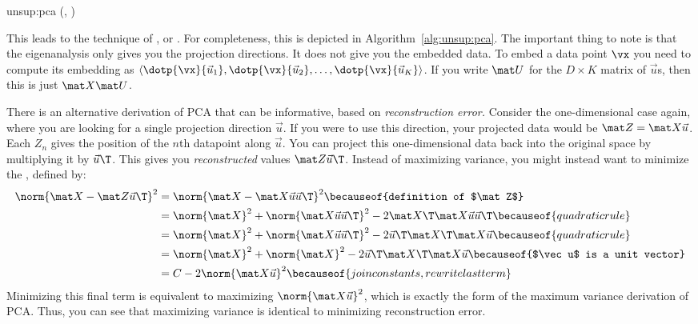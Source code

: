 \newalgorithm%
  {unsup:pca}%
  {(, )}
  {
}

This leads to the technique of , or .  For completeness, this is depicted in
Algorithm~\ref{alg:unsup:pca}.  The important thing to note is that
the eigenanalysis only gives you the projection directions.  It does
not give you the embedded data.  To embed a data point $\vx$ you need
to compute its embedding as $\langle \dotp{\vx}{\vec u_1},
\dotp{\vx}{\vec u_2}, \dots, \dotp{\vx}{\vec u_K} \rangle$.  If you
write $\mat U$ for the $D \times K$ matrix of $\vec u$s, then this is
just $\mat X \mat U$.

There is an alternative derivation of PCA that can be informative,
based on \emph{reconstruction error.}  Consider the one-dimensional
case again, where you are looking for a single projection direction
$\vec u$.  If you were to use this direction, your projected data
would be $\mat Z = \mat X \vec u$.  Each $Z_n$ gives the position of
the $n$th datapoint along $\vec u$.  You can project this
one-dimensional data back into the original space by multiplying it by
$\vec u\T$.  This gives you \emph{reconstructed} values $\mat Z \vec
u\T$.  Instead of maximizing variance, you might instead want to
minimize the , defined by:
%
\begin{align}
\norm{ \mat X - \mat Z\vec u\T}^2
&= \norm{ \mat X - \mat X \vec u \vec u\T }^2
\becauseof{definition of $\mat Z$}\\
&= \norm{\mat X}^2
 + \norm{\mat X \vec u \vec u\T}^2
 - 2 \mat X\T \mat X \vec u \vec u\T
\becauseof{quadratic rule}\\
&= \norm{\mat X}^2
 + \norm{\mat X \vec u \vec u\T}^2
 - 2 \vec u\T\mat X\T \mat X \vec u
\becauseof{quadratic rule}\\
&= \norm{\mat X}^2
 + \norm{\mat X}^2
 - 2 \vec u\T\mat X\T \mat X \vec u
\becauseof{$\vec u$ is a unit vector} \\
&= C - 2 \norm{\mat X \vec u}^2
\becauseof{join constants, rewrite last term}
\end{align}
%
Minimizing this final term is equivalent to maximizing $\norm{\mat
  X\vec u}^2$, which is exactly the form of the maximum variance
derivation of PCA.  Thus, you can see that maximizing variance is
identical to minimizing reconstruction error.

